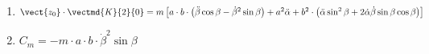 \begin{multicols}{2}
\begin{enumerate}
\item $\vect{z_0}\cdot \vectmd{K}{2}{0}=m\left[a\cdot b\cdot \left(\ddot{\beta}\cos\beta-\dot{\beta}^2\sin\beta\right)+a^2\ddot{\alpha}+b^2\cdot\left(\ddot{\alpha}\sin^2\beta+2\dot{\alpha}\dot{\beta}\sin\beta\cos\beta\right)\right]$
\item $
C_m=-m\cdot a\cdot b\cdot \dot{\beta}^2\sin\beta
$
\end{enumerate}
\normalsize
\fi
\fi

\ifprof
\else
\end{multicols}
\fi

